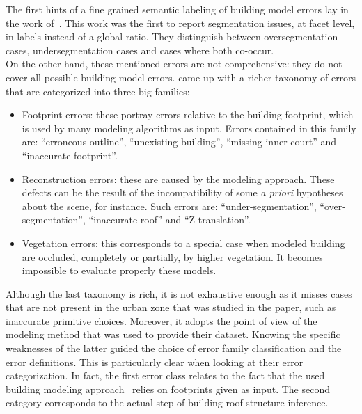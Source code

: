             The first hints of a fine grained semantic labeling of building model errors lay in the work of~\textcite{rottensteiner2014results}.
            This work was the first to report segmentation issues, at facet level, in labels instead of a global ratio.
            They distinguish between oversegmentation cases, undersegmentation cases and cases where both co-occur.\\

            On the other hand, these mentioned errors are not comprehensive: they do not cover all possible building model errors.
            \textcite{michelin2013quality} came up with a richer taxonomy of errors that are categorized into three big families:
            \begin{itemize}
                \item Footprint errors: these portray errors relative to the building footprint, which is used by many modeling algorithms as input.
                        Errors contained in this family are: ``erroneous outline'', ``unexisting building'', ``missing inner court'' and ``inaccurate footprint''.
                \item Reconstruction errors: these are caused by the modeling approach.
                        These defects can be the result of the incompatibility of some \textit{a priori} hypotheses about the scene, for instance.
                        Such errors are: ``under-segmentation'', ``over-segmentation'', ``inaccurate roof'' and ``Z translation''.
                \item Vegetation errors: this corresponds to a special case when modeled building are occluded, completely or partially, by higher vegetation.
                        It becomes impossible to evaluate properly these models.
            \end{itemize}
            Although the last taxonomy is rich, it is not exhaustive enough as it misses cases that are not present in the urban zone that was studied in the paper, such as inaccurate primitive choices.
            Moreover, it adopts the point of view of the modeling method that was used to provide their dataset.
            Knowing the specific weaknesses of the latter guided the choice of error family classification and the error definitions.
            This is particularly clear when looking at their error categorization.
            In fact, the first error class relates to the fact that the used building modeling approach~\parencite{durupt2006automatic} relies on footprints given as input.
            The second category corresponds to the actual step of building roof structure inference.

